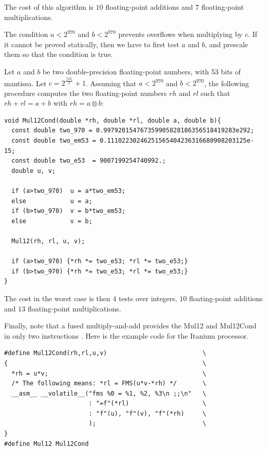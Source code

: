 The cost of this algorithm is $10$ floating-point
additions and $7$ floating-point multiplications.



The condition $a<2^{970}$ and $b<2^{970}$ prevents overflows when
multiplying by $c$. If it cannot be proved statically, then we have to
first test $a$ and $b$, and prescale them so that the condition is
true.


\begin{theorem}
  Let $a$ and $b$ be two double-precision floating-point numbers, with
  53 bits of mantissa. Let $c=2^{\frac{\lceil 53 \rceil}{2}}+1$.
  Assuming that $a<2^{970}$ and $b<2^{970}$, the following procedure
  computes the two floating-point numbers $rh$ and $rl$ such that $rh
  + rl = a + b$ with $rh = a \otimes b$:

\begin{lstlisting}[label={lst:Mul12Cond},caption={Mul12Cond},firstnumber=1]
void Mul12Cond(double *rh, double *rl, double a, double b){
  const double two_970 = 0.997920154767359905828186356518419283e292;
  const double two_em53 = 0.11102230246251565404236316680908203125e-15;
  const double two_e53  = 9007199254740992.;
  double u, v;

  if (a>two_970)  u = a*two_em53; 
  else            u = a;
  if (b>two_970)  v = b*two_em53; 
  else            v = b;

  Mul12(rh, rl, u, v);

  if (a>two_970) {*rh *= two_e53; *rl *= two_e53;} 
  if (b>two_970) {*rh *= two_e53; *rl *= two_e53;} 
}\end{lstlisting}
\end{theorem}

The cost in the worst case is then $4$ tests over integers,
$10$ floating-point additions and $13$ floating-point multiplications.


Finally, note that a fused multiply-and-add provides the Mul12 and
Mul12Cond in only two instructions \cite{CorneaHarrisonTang2002}. Here
is the example code for the Itanium processor.

\begin{lstlisting}[label={lst:Mul12CondFMA},caption={Mul12 on the Itanium},firstnumber=1]
#define Mul12Cond(rh,rl,u,v)                          \
{                                                     \
  *rh = u*v;                                          \
  /* The following means: *rl = FMS(u*v-*rh) */       \
  __asm__ __volatile__("fms %0 = %1, %2, %3\n ;;\n"   \
                       : "=f"(*rl)                    \
                       : "f"(u), "f"(v), "f"(*rh)     \
                       );                             \
}
#define Mul12 Mul12Cond
\end{lstlisting}





